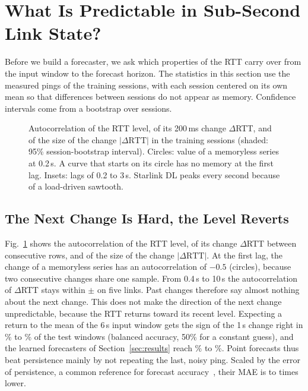 \section{What Is Predictable in Sub-Second Link State?}
\label{sec:predictable}
Before we build a forecaster, we ask which properties of the RTT carry over from the input window to the forecast horizon. The statistics in this section use the measured pings of the training sessions, with each session centered on its own mean so that differences between sessions do not appear as memory. Confidence intervals come from a bootstrap over sessions.

\begin{figure}[t]
  \centering
  
  \caption{Autocorrelation of the RTT level, of its 200\,ms change $\Delta$RTT, and of the size of the change $|\Delta\mathrm{RTT}|$ in the training sessions (shaded: 95\% session-bootstrap interval). Circles: value of a memoryless series at 0.2\,s. A curve that starts on its circle has no memory at the first lag. Insets: lags of 0.2 to 3\,s. Starlink DL peaks every second because of a load-driven sawtooth.}
  \label{fig:vol}
\end{figure}

\subsection{The Next Change Is Hard, the Level Reverts}
Fig.~\ref{fig:vol} shows the autocorrelation of the RTT level, of its change $\Delta$RTT between consecutive rows, and of the size of the change $|\Delta\mathrm{RTT}|$. At the first lag, the change of a memoryless series has an autocorrelation of $-0.5$ (circles), because two consecutive changes share one sample. From 0.4\,s to 10\,s the autocorrelation of $\Delta$RTT stays within $\pm$\VolDmaxAbs{} on five links. Past changes therefore say almost nothing about the next change. This does not make the direction of the next change unpredictable, because the RTT returns toward its recent level. Expecting a return to the mean of the 6\,s input window gets the sign of the 1\,s change right in \VolSignRevLo\% to \VolSignRevHi\% of the test windows (balanced accuracy, 50\% for a constant guess), and the learned forecasters of Section~\ref{sec:results} reach \VolSignNNLo\% to \VolSignNNHi\%. Point forecasts thus beat persistence mainly by not repeating the last, noisy ping. Scaled by the error of persistence, a common reference for forecast accuracy~\cite{hyndman2006another}, their MAE is \PersRatioLo{} to \PersRatioHi{} times lower.

